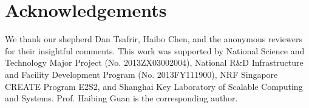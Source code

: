 \section{Acknowledgements}
\label{sec:ack}
We thank  our shepherd Dan Tsafrir, Haibo Chen, and the anonymous reviewers for their insightful comments. This work was supported by National Science and Technology Major Project (No. 2013ZX03002004), National R\&D Infrastructure and Facility Development Program (No. 2013FY111900), NRF Singapore CREATE Program E2S2, and Shanghai
Key Laboratory of Scalable Computing and Systems. Prof. Haibing Guan is the corresponding author. 

